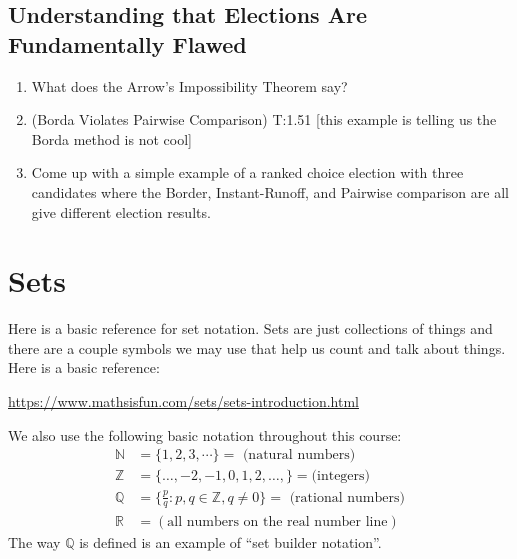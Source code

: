 \documentclass[11pt, letterpaper]{article}
\begin{document}
\subsection{Understanding that Elections Are Fundamentally Flawed}
\begin{enumerate}
	\item What does the Arrow's Impossibility Theorem say?
	\item (Borda Violates Pairwise Comparison) T:1.51 [this example is telling us the Borda method is not cool]
	\item Come up with a simple example of a ranked choice election with three candidates where the Border, Instant-Runoff, and Pairwise comparison are all give different election results.
\end{enumerate}
\newpage


\section{Sets}

Here is a basic reference for set notation. 
Sets are just collections of things and there are a couple symbols we may use that help us count and talk about things.
Here is a basic reference: 
\begin{center}
	\url{https://www.mathsisfun.com/sets/sets-introduction.html}
\end{center}
We also use the following basic notation throughout this course:
\begin{align*}
\mathbb{N} &= \lbrace 1, 2, 3, \cdots \rbrace = \mbox{ (natural numbers) }\\
\mathbb{Z} &= \lbrace \ldots, -2,-1,0,1,2,\ldots,\rbrace = \mbox{(integers)}\\
\mathbb{Q} &= \lbrace \frac{p}{q} \colon p,q \in \mathbb{Z}, q\neq 0 \rbrace =\mbox{ (rational numbers)}\\
\mathbb{R} &= (\mbox{all numbers on the real number line})
\end{align*}
The way $\mathbb{Q}$ is defined is an example of ``set builder notation''.
\end{document}
